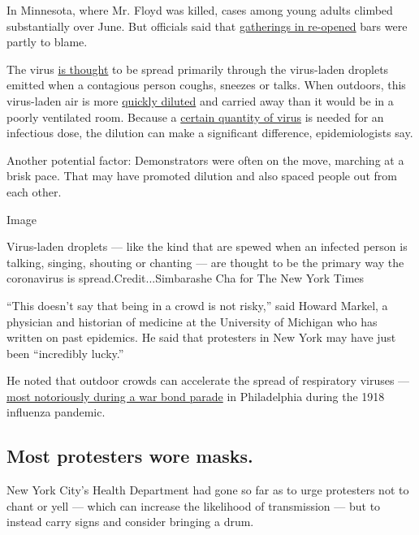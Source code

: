 In Minnesota, where Mr. Floyd was killed, cases among young adults
climbed substantially over June. But officials said that
\href{https://www.twincities.com/2020/06/26/coronavirus-friday-update-cases-jump-by-493-as-five-more-minnesotans-die-of-covid-19/}{gatherings
in re-opened} bars were partly to blame.

The virus
\href{https://www.cdc.gov/coronavirus/2019-ncov/prevent-getting-sick/how-covid-spreads.html}{is
thought} to be spread primarily through the virus-laden droplets emitted
when a contagious person coughs, sneezes or talks. When outdoors, this
virus-laden air is more
\href{https://www.nytimes3xbfgragh.onion/2020/05/15/us/coronavirus-what-to-do-outside.html}{quickly
diluted} and carried away than it would be in a poorly ventilated room.
Because a
\href{https://www.statnews.com/2020/04/14/how-much-of-the-coronavirus-does-it-take-to-make-you-sick/}{certain
quantity of virus} is needed for an infectious dose, the dilution can
make a significant difference, epidemiologists say.

Another potential factor: Demonstrators were often on the move, marching
at a brisk pace. That may have promoted dilution and also spaced people
out from each other.

Image

Virus-laden droplets --- like the kind that are spewed when an infected
person is talking, singing, shouting or chanting --- are thought to be
the primary way the coronavirus is spread.Credit...Simbarashe Cha for
The New York Times

``This doesn't say that being in a crowd is not risky,'' said Howard
Markel, a physician and historian of medicine at the University of
Michigan who has written on past epidemics. He said that protesters in
New York may have just been ``incredibly lucky.''

He noted that outdoor crowds can accelerate the spread of respiratory
viruses ---
\href{https://www.nytimes3xbfgragh.onion/2020/04/04/us/coronavirus-spanish-flu-philadelphia-pennsylvania.html}{most
notoriously during a war bond parade} in Philadelphia during the 1918
influenza pandemic.

\hypertarget{most-protesters-wore-masks}{%
\subsection{Most protesters wore
masks.}\label{most-protesters-wore-masks}}

New York City's Health Department had gone so far as to urge protesters
not to chant or yell --- which can increase the likelihood of
transmission --- but to instead carry signs and consider bringing a
drum.

